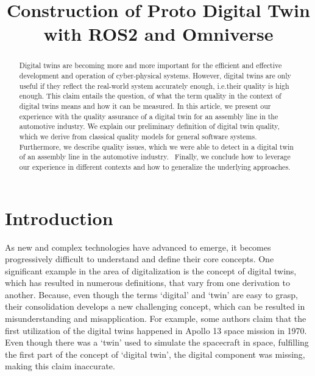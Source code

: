 \documentclass[conference]{IEEEtran}
\begin{document}
    \title{Construction of Proto Digital Twin with ROS2 and Omniverse}
    \author{ 
    \and 
    }
   
    \maketitle

    \begin{abstract}
        Digital twins are becoming more and more important for the efficient and effective development and operation of cyber-physical systems.
        However, digital twins are only useful if they reflect the real-world system accurately enough, i.e.their quality is high enough. 
        This claim entails the question, of what the term quality in the context of digital twins means and how it can be measured. 
        In this article, we present our experience with the quality assurance of a digital twin for an assembly line in the automotive industry.
        We explain our preliminary definition of digital twin quality, which we derive from classical quality models for general software systems. 
        Furthermore, we describe quality issues, which we were able to detect in a digital twin of an assembly line in the automotive industry. \
        Finally, we conclude how to leverage our experience in different contexts and how to generalize the underlying approaches.
    \end{abstract}

    \section{Introduction}\label{section:introduction}
    As new and complex technologies have advanced to emerge, it becomes progressively 
    difficult to understand and define their core concepts. One significant example in the 
    area of digitalization is the concept of digital twins, which has resulted in numerous definitions, that vary 
    from one derivation to another. Because, even though the terms `digital' and `twin' are easy to grasp,  their 
    consolidation develops a new challenging concept, which can be resulted in misunderstanding and misapplication. For example, 
    some authors claim that the first utilization of the digital twins 
    happened in Apollo 13 space mission in 1970. Even though there was a `twin' used to simulate the spacecraft in space, fulfilling the first part of the concept of 
    `digital twin', the digital component was missing, making this claim inaccurate.
    
\end{document}
